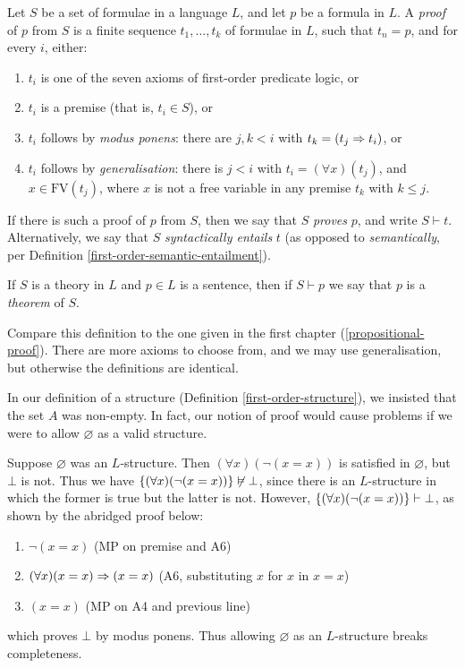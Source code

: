 \documentclass{article}
\begin{document}
\begin{definition}[Proof]
    Let $S$ be a set of formulae in a language $L$, and let $p$ be a formula in $L$. A \textit{proof} of $p$ from $S$ is a finite sequence $t_1, \dots, t_k$ of formulae in $L$, such that $t_n = p$, and for every $i$, either:
    \begin{enumerate}
	    \item $t_i$ is one of the seven axioms of first-order predicate logic, or
	    \item $t_i$ is a premise (that is, $t_i \in S$), or
	    \item $t_i$ follows by \textit{modus ponens}: there are $j,k < i$ with $t_k = (t_j \Rightarrow t_i)$, or
	    \item $t_i$ follows by \textit{generalisation}: there is $j < i$ with $t_i = (\forall x)(t_j)$, and $x \in \mathrm{FV}(t_j)$, where $x$ is not a free variable in any premise $t_k$ with $k \leq j$.
	\end{enumerate}
	If there is such a proof of $p$ from $S$, then we say that $S$ \textit{proves} $p$, and write $S \vdash t$. Alternatively, we say that $S$ \textit{syntactically entails} $t$ (as opposed to \textit{semantically}, per Definition \ref{first-order-semantic-entailment}).
	
	If $S$ is a theory in $L$ and $p \in L$ is a sentence, then if $S \vdash p$ we say that $p$ is a \textit{theorem} of $S$.
\end{definition}

Compare this definition to the one given in the first chapter (\ref{propositional-proof}). There are more axioms to choose from, and we may use generalisation, but otherwise the definitions are identical.

\begin{remark}
	\label{no-empty-set-simplifying-first-order}
    In our definition of a structure (Definition \ref{first-order-structure}), we insisted that the set $A$ was non-empty. In fact, our notion of proof would cause problems if we were to allow $\varnothing$ as a valid structure.
    
    Suppose $\varnothing$ was an $L$-structure. Then $(\forall x)(\lnot(x=x))$ is satisfied in $\varnothing$, but $\bot$ is not. Thus we have $\left\lbrace (\forall x)(\lnot(x=x)) \right\rbrace \not\vDash \bot$, since there is an $L$-structure in which the former is true but the latter is not. However, $\left\lbrace (\forall x)(\lnot(x=x)) \right\rbrace\vdash \bot$, as shown by the abridged proof below:
    \begin{enumerate}
	    \item $\lnot (x = x)$ \hfill (MP on premise and A6)
	    \item $(\forall x)(x = x) \Rightarrow (x = x)$ \hfill (A6, substituting $x$ for $x$ in  $x=x$)
	    \item $(x = x)$ \hfill (MP on A4 and previous line)
	\end{enumerate}
	which proves $\bot$ by modus ponens. Thus allowing $\varnothing$ as an $L$-structure breaks completeness.
\end{remark}
\end{document}
